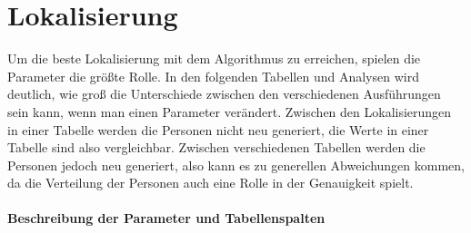 \section{Lokalisierung}

Um die beste Lokalisierung mit dem Algorithmus zu erreichen, spielen die Parameter die größte Rolle. In den folgenden Tabellen und Analysen wird deutlich, wie groß die Unterschiede zwischen den verschiedenen Ausführungen sein kann, wenn man einen Parameter verändert. Zwischen den Lokalisierungen in einer Tabelle werden die Personen nicht neu generiert, die Werte in einer Tabelle sind also vergleichbar. Zwischen verschiedenen Tabellen werden die Personen jedoch neu generiert, also kann es zu generellen Abweichungen kommen, da die Verteilung der Personen auch eine Rolle in der Genauigkeit spielt.

\paragraph{Beschreibung der Parameter und Tabellenspalten}

